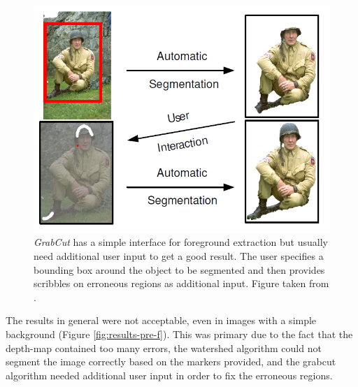\begin{figure}[t]
\centering
\includegraphics[width=0.6\columnwidth]{Chapter4/4/grabcut.png}
\caption[GrabCut example.]{\textit{GrabCut} has a simple interface for foreground extraction but usually need additional user input to get a good result. The user specifies a bounding box around the object to be segmented and then provides scribbles on erroneous regions as additional input. Figure taken from \cite{grabcut}.}
\label{fig:grab-f}
\end{figure}

\par
The results in general were not acceptable, even in images with a simple background (Figure \ref{fig:results-pre-f}). This was primary due to the fact that the depth-map contained too many errors, the watershed algorithm could not segment the image correctly based on the markers provided, and the grabcut algorithm needed additional user input in order to fix the erroneous regions.

